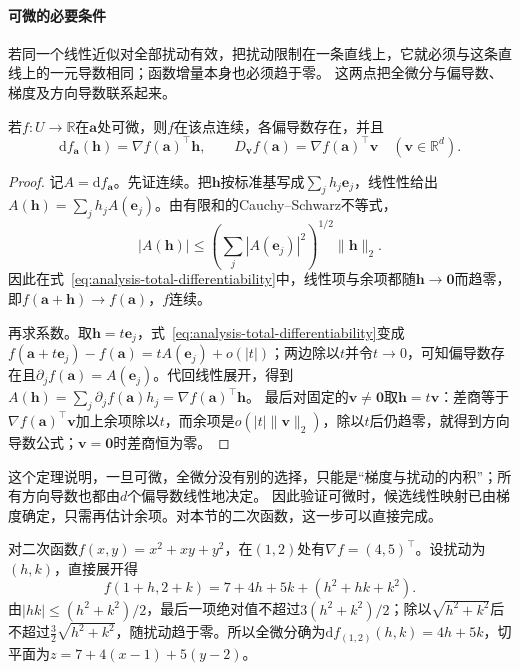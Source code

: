 \paragraph{可微的必要条件}
若同一个线性近似对全部扰动有效，把扰动限制在一条直线上，它就必须与这条直线上的一元导数相同；函数增量本身也必须趋于零。
这两点把全微分与偏导数、梯度及方向导数联系起来。
\begin{theorem}
\label{thm:multivariable-differentiable-necessary}
若$f:U\to\mathbb R$在$\bm a$处可微，则$f$在该点连续，各偏导数存在，并且
\[
 \mathrm df_{\bm a}(\bm h)=\nabla f(\bm a)^\top\bm h,
 \qquad D_{\bm v}f(\bm a)=\nabla f(\bm a)^\top\bm v
 \quad(\bm v\in\mathbb R^d).
\]
\end{theorem}
\begin{proof}
记$A=\mathrm df_{\bm a}$。先证连续。把$\bm h$按标准基写成$\sum_jh_j\bm e_j$，线性性给出$A(\bm h)=\sum_jh_jA(\bm e_j)$。由有限和的Cauchy--Schwarz不等式，
\[
 |A(\bm h)|\leq\left(\sum_j|A(\bm e_j)|^2\right)^{1/2}\lVert\bm h\rVert_2.
\]
因此在式~\eqref{eq:analysis-total-differentiability}中，线性项与余项都随$\bm h\to\bm 0$而趋零，即$f(\bm a+\bm h)\to f(\bm a)$，$f$连续。

再求系数。取$\bm h=t\bm e_j$，式~\eqref{eq:analysis-total-differentiability}变成$f(\bm a+t\bm e_j)-f(\bm a)=tA(\bm e_j)+o(|t|)$；两边除以$t$并令$t\to0$，可知偏导数存在且$\partial_jf(\bm a)=A(\bm e_j)$。代回线性展开，得到$A(\bm h)=\sum_j\partial_jf(\bm a)h_j=\nabla f(\bm a)^\top\bm h$。
最后对固定的$\bm v\neq\bm0$取$\bm h=t\bm v$：差商等于$\nabla f(\bm a)^\top\bm v$加上余项除以$t$，而余项是$o(|t|\lVert\bm v\rVert_2)$，除以$t$后仍趋零，就得到方向导数公式；$\bm v=\bm0$时差商恒为零。
\end{proof}
这个定理说明，一旦可微，全微分没有别的选择，只能是“梯度与扰动的内积”；所有方向导数也都由$d$个偏导数线性地决定。
因此验证可微时，候选线性映射已由梯度确定，只需再估计余项。对本节的二次函数，这一步可以直接完成。
\begin{example}[二元二次函数的全微分]
\label{ex:multivariable-quadratic-differential}
对二次函数$f(x,y)=x^2+xy+y^2$，在$(1,2)$处有$\nabla f=(4,5)^\top$。设扰动为$(h,k)$，直接展开得
\[
 f(1+h,2+k)=7+4h+5k+(h^2+hk+k^2).
\]
由$|hk|\leq(h^2+k^2)/2$，最后一项绝对值不超过$3(h^2+k^2)/2$；除以$\sqrt{h^2+k^2}$后不超过$\tfrac32\sqrt{h^2+k^2}$，随扰动趋于零。所以全微分确为$\mathrm df_{(1,2)}(h,k)=4h+5k$，切平面为$z=7+4(x-1)+5(y-2)$。
\end{example}

